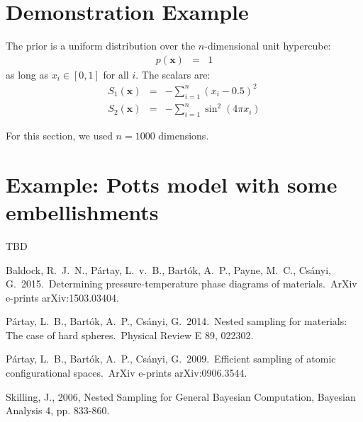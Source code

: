 \documentclass[a4paper, 11pt]{article}
\newcommand{\xx}{\mathbf{x}}	%
\begin{document}
\section{Demonstration Example}
The prior is a uniform distribution over the $n$-dimensional unit hypercube:
\begin{eqnarray}
p(\xx) &=& 1
\end{eqnarray}
as long as $x_i \in [0, 1]$ for all $i$. The scalars are:
\begin{eqnarray}
S_1(\xx) &=& -\sum_{i=1}^n \left(x_i - 0.5\right)^2\\
S_2(\xx) &=& -\sum_{i=1}^n \sin^2\left(4\pi x_i\right)
\end{eqnarray}

For this section, we used $n=1000$ dimensions.

\section{Example: Potts model with some embellishments}
TBD

\begin{thebibliography}{99}

 Baldock, R.~J.~N., 
P{\'a}rtay, L.~v.~B., Bart{\'o}k, A.~P., Payne, M.~C., Cs{\'a}nyi, G.\ 
2015.\ Determining pressure-temperature phase diagrams of materials.\ ArXiv 
e-prints arXiv:1503.03404. 

 P{\'a}rtay, L.~B., 
Bart{\'o}k, A.~P., Cs{\'a}nyi, G.\ 2014.\ Nested sampling for materials: 
The case of hard spheres.\ Physical Review E 89, 022302. 

 P{\'a}rtay, L.~B., 
Bart{\'o}k, A.~P., Cs{\'a}nyi, G.\ 2009.\ Efficient sampling of atomic 
configurational spaces.\ ArXiv e-prints arXiv:0906.3544. 

 Skilling, J., 2006, Nested Sampling for General Bayesian Computation, Bayesian Analysis 4, pp. 833-860.

\end{thebibliography}
\end{document}
